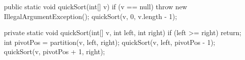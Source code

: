 \begin{unipdcode}[language=Java]
public static void quickSort(int[] v) {
    if (v == null) throw new IllegalArgumentException();
    quickSort(v, 0, v.length - 1);
}

private static void quickSort(int[] v, int left, int right) {
    if (left >= right) return;
    int pivotPos = partition(v, left, right);
    quickSort(v, left, pivotPos - 1);
    quickSort(v, pivotPos + 1, right);
}
\end{unipdcode}
